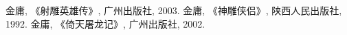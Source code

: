 \cleardoublepage
{}
{}

\begin{thebibliography}{99}
 金庸, 《射雕英雄传》, 广州出版社, 2003. 
 金庸, 《神雕侠侣》, 陕西人民出版社, 1992. 
 金庸, 《倚天屠龙记》, 广州出版社, 2002. 
\end{thebibliography}

